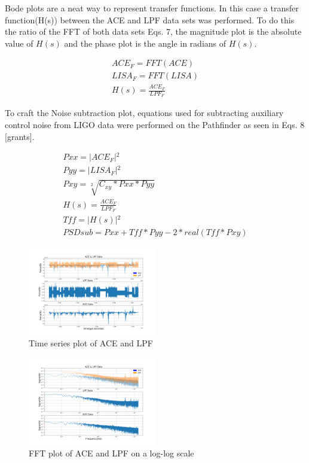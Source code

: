 \documentclass[%
 reprint,
 amsmath,amssymb,
 aps,
]{revtex4-2}
\begin{document}
Bode plots are a neat way to represent transfer functions. In this case a transfer function(H(s)) between the ACE and LPF data sets was performed. To do this the ratio of the FFT of both data sets Eqs. 7, the magnitude plot is the absolute value of \(H(s)\) and the phase plot is the angle in radians of \(H(s)\).

\begin{equation}\label{eq:Transfer function}
\begin{split}
ACE_F=FFT(ACE) \\
LISA_F=FFT(LISA) \\
H(s)=\frac{ACE_F}{LPF_F}
\end{split}
\end{equation}

To craft the Noise subtraction plot, equations used for subtracting auxiliary control noise from LIGO data were performed on the Pathfinder as seen in Eqs. 8 [grants].

\begin{equation}\label{eq:Transfer function}
\begin{split}
Pxx=|ACE_F|{^2} \\
Pyy=|LISA_F|{^2} \\
Pxy=\sqrt[2]{C_{{xy}}*Pxx*Pyy}\\
H(s)=\frac{ACE_F}{LPF_F}\\
Tff=|H(s)|{^2}\\
PSDsub=Pxx+Tff*Pyy-2*real(Tff*Pxy)
\end{split}
\end{equation}


\begin{figure}[bp]
\centerline{\includegraphics[width=0.5\textwidth]{TimeDomain_Comparison_ACEvLPF-1.png}}
\caption{Time series plot of ACE and LPF}
\label{fig}
\end{figure}
\begin{figure}[htbp]
\centerline{\includegraphics[width=0.5\textwidth]{ACE_and_LPF_loglo-1.png}}
\caption{FFT plot of ACE and LPF on a log-log scale}
\label{fig}
\end{figure}
\end{document}
